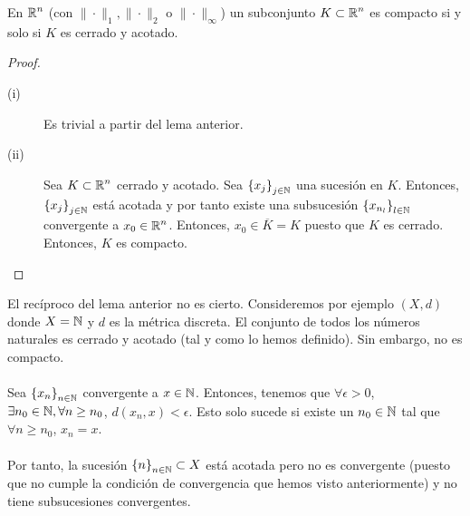 \begin{theorem}
En $\displaystyle \mathbb{R}^{n} $ (con $\displaystyle \| \cdot \|_{1}, \| \cdot \|_{2} $ o $\displaystyle \| \cdot \|_{\infty} $) un subconjunto $\displaystyle K \subset \mathbb{R}^{n} $ es compacto si y solo si $\displaystyle K $ es cerrado y acotado.
\end{theorem}
\begin{proof}
\begin{description}
	\item[(i)] Es trivial a partir del lema anterior.
	\item[(ii)] Sea $\displaystyle K \subset \mathbb{R}^{n} $ cerrado y acotado. Sea $\displaystyle \left\{ x_{j}\right\} _{j \in \mathbb{N}} $ una sucesión en $\displaystyle K $. Entonces, $\displaystyle \left\{ x_{j}\right\} _{j \in \mathbb{N}} $ está acotada y por tanto existe una subsucesión $\displaystyle \left\{ x_{n_{l}}\right\} _{l \in \mathbb{N}} $ convergente a $\displaystyle x_{0} \in \mathbb{R}^{n} $. 
		Entonces, $\displaystyle x_{0} \in \overline{K} = K $ puesto que $\displaystyle K $ es cerrado. Entonces, $\displaystyle K $ es compacto.
\end{description}
\end{proof}
\begin{eg}
El recíproco del lema anterior no es cierto. Consideremos por ejemplo $\displaystyle \left(X,d\right) $ donde $\displaystyle X = \mathbb{N} $ y $\displaystyle d $ es la métrica discreta. El conjunto de todos los números naturales es cerrado y acotado (tal y como lo hemos definido). Sin embargo, no es compacto. \\ \\
Sea $\displaystyle \left\{ x_{n}\right\} _{n\in\mathbb{N}} $ convergente a $\displaystyle x \in \mathbb{N} $. Entonces, tenemos que $\displaystyle \forall \epsilon > 0 $, $\displaystyle \exists n_{0} \in \mathbb{N}, \forall n \geq n_{0} $, $\displaystyle d\left(x_{n}, x\right) < \epsilon  $. Esto solo sucede si existe un $\displaystyle n_{0} \in \mathbb{N} $ tal que $\displaystyle \forall n\geq n_{0} $, $\displaystyle x_{n} = x $. \\ \\
Por tanto, la sucesión $\displaystyle \left\{ n\right\} _{n\in\mathbb{N}} \subset X$ está acotada pero no es convergente (puesto que no cumple la condición de convergencia que hemos visto anteriormente) y no tiene subsucesiones convergentes. 
\end{eg}
